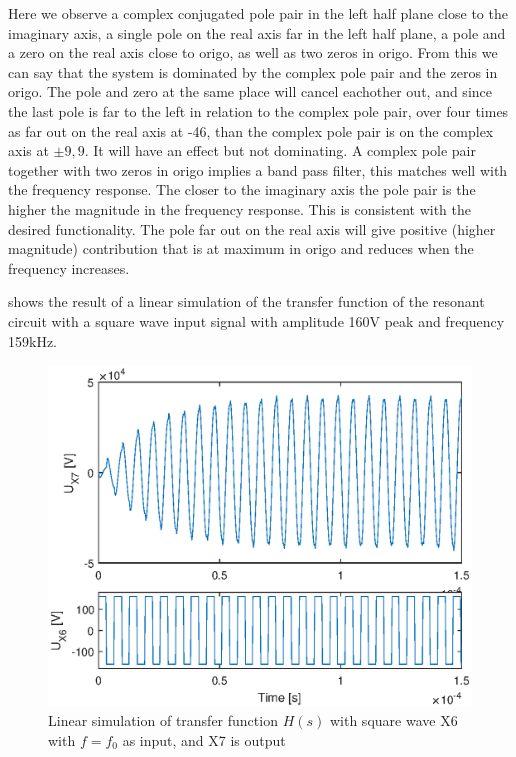 Here we observe a complex conjugated pole pair in the left half plane close to the imaginary axis, a single pole on the real axis far in the left half plane, a pole and a zero on the real axis close to origo, as well as two zeros in origo. From this we can say that the system is dominated by the complex pole pair and the zeros in origo. The pole and zero at the same place will cancel eachother out, and since the last pole is far to the left in relation to the complex pole pair, over four times as far out on the real axis at -46, than the complex pole pair is on the complex axis at $\pm 9,9$. It will have an effect but not dominating. A complex pole pair together with two zeros in origo implies a band pass filter, this matches well with the frequency response. The closer to the imaginary axis the pole pair is the higher the magnitude in the frequency response. This is consistent with the desired functionality. The pole far out on the real axis will give positive (higher magnitude) contribution that is at maximum in origo and reduces when the frequency increases.

 shows the result of a linear simulation of the transfer function of the resonant circuit with a square wave input signal with amplitude 160V peak and frequency 159kHz.

\begin{figure}[H]
    \centering
    \includegraphics[width=\textwidth]{img/CoilRigSimulation.eps}
    \caption{Linear simulation of transfer function $H(s)$ with square wave X6 with $f=f_0$ as input, and X7 is output}
    \label{fig:crlinsim}
\end{figure}

